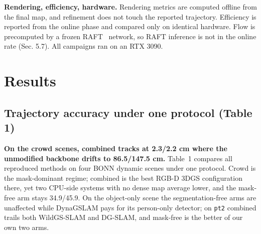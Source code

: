 \textbf{Rendering, efficiency, hardware.} Rendering metrics are computed offline from the final map, and refinement does not touch the reported trajectory. Efficiency is reported from the online phase and compared only on identical hardware. Flow is precomputed by a frozen RAFT~\cite{raft} network, so RAFT inference is not in the online rate (Sec. 5.7). All campaigns ran on an RTX 3090.




\section{Results}


\subsection{Trajectory accuracy under one protocol (Table 1)}


\textbf{On the crowd scenes, combined tracks at 2.3/2.2 cm where the unmodified backbone drifts to 86.5/147.5 cm.} Table~1 compares all reproduced methods on four BONN dynamic scenes under one protocol. Crowd is the mask-dominant regime; combined is the best RGB-D 3DGS configuration there, yet two CPU-side systems with no dense map average lower, and the mask-free arm stays 34.9/45.9. On the object-only scene the segmentation-free arms are unaffected while DynaGSLAM pays for its person-only detector; on \texttt{pt2} combined trails both WildGS-SLAM and DG-SLAM, and mask-free is the better of our own two arms.


